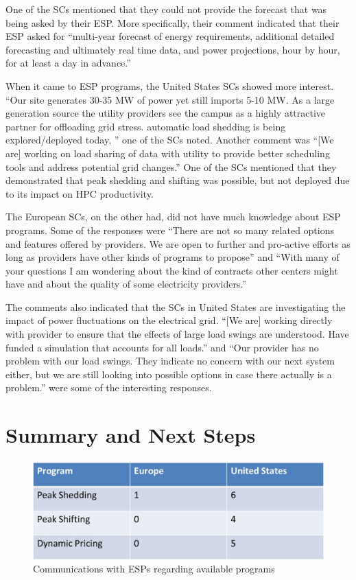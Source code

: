 \documentclass{llncs}
\begin{document}
One of the SCs mentioned that they could not provide the forecast that was being asked by their ESP. More specifically, their comment indicated that their ESP asked for ``multi-year forecast of energy requirements, additional detailed forecasting and ultimately real time data, and power projections, hour by hour, for at least a day in advance.''

When it came to ESP programs, the United States SCs showed more interest. ``Our site generates 30-35 MW of power yet still imports 5-10 MW. As a large generation source the utility providers see the campus as a highly attractive partner for offloading grid stress. automatic load shedding is being explored/deployed today, '' one of the SCs noted. Another comment was ``[We are] working on load sharing of data with utility to provide better scheduling tools and address potential grid changes.'' One of the SCs mentioned that they demonstrated that peak shedding and shifting was possible, but not deployed due to its impact on HPC productivity. 

The European SCs, on the other had, did not have much knowledge about ESP programs. Some of the responses were ``There are not so many related options and features offered by providers. We are open to further and pro-active efforts as long as providers have other kinds of programs to propose'' and ``With many of your questions I am wondering about the kind of contracts other centers might have and about the quality of some electricity providers.''

The comments also indicated that the SCs in United States are investigating the impact of power fluctuations on the electrical grid. ``[We are] working directly with provider to ensure that the effects of large load swings are understood. Have funded a simulation that accounts for all loads.'' and ``Our provider has no problem with our load swings. They indicate no concern with our next system either, but we are still looking into possible options in case there actually is a problem.'' were some of the interesting responses.

\section{Summary and Next Steps}
\label{summary}

\begin{figure}
\begin{center}
\includegraphics[scale=0.5]{figs/Table3.jpg}
\caption{Communications with ESPs regarding available programs}
\label{fig:table3}
\end{center}
\end{figure}
\end{document}
